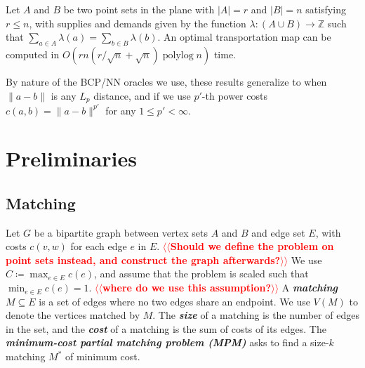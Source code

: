 \documentclass[a4paper,UKenglish]{socg-lipics-v2018}
\makeatletter
\def\note#1{\textcolor{red}{{#1}}}
\def\polylog{\mathop{\mathrm{polylog}}}
\def\ints{\mathbb{Z}}
\def\norm#1{\mathopen\| #1 \mathclose\|}	%
\def\tsupply{\lambda}
\theoremstyle{plain}
\numberwithin{figure}{section}
\def\EMPH#1{\textbf{\emph{\boldmath #1}}}
\def\n@te#1{\textsf{\boldmath \textbf{$\langle\!\langle$#1$\rangle\!\rangle$}}\leavevmode}
\def\note#1{\textcolor{red}{\n@te{#1}}}
\makeatother
\begin{document}
\begin{theorem}
\label{theorem:orlin}
Let $A$ and $B$ be two point sets in the plane with $|A| = r$ and $|B| = n$
satisfying $r \le n$, with supplies and demands given by the function
$\tsupply: (A \cup B) \to \ints$ such that
$\sum_{a \in A} \tsupply(a) = \sum_{b \in B} \tsupply(b)$.
An optimal transportation map can be computed in
$O(rn(r/\sqrt{n} + \sqrt{n})\polylog n)$ time.
\end{theorem}



By nature of the BCP/NN oracles we use, these results generalize to when
$\norm{a-b}$ is any $L_p$ distance, and if we use $p'$-th power costs
$c(a, b) = \norm{a-b}^{p'}$ for any $1 \le p' < \infty$.


\section{Preliminaries}
\label{section:prelim}

\subsection{Matching}

Let $G$ be a bipartite graph between vertex sets $A$ and $B$ and edge set $E$,
with costs $c(v, w)$ for each edge $e$ in $E$.
\note{Should we define the problem on point sets instead, and construct the graph afterwards?}
We use $C \coloneqq \max_{e \in E} c(e)$, and assume that the problem is scaled such
that $\min_{e \in E} c(e) = 1$. \note{where do we use this assumption?}
A \EMPH{matching} $M \subseteq E$ is a set of edges where no two edges share an
endpoint.
We use $V(M)$ to denote the vertices matched by $M$.
The \EMPH{size} of a matching is the number of edges in the set, and the
\EMPH{cost} of a matching is the sum of costs of its edges.
The \EMPH{minimum-cost partial matching problem (MPM)} asks to find a size-$k$
matching $M^*$ of minimum cost.
\end{document}
